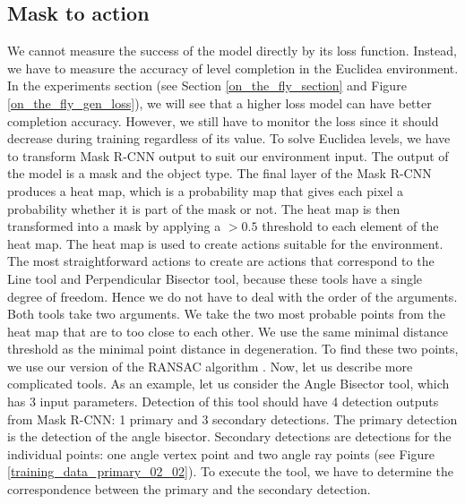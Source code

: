 \subsection{Mask to action}
We cannot measure the success of the model directly by its loss function. Instead, we have to measure the accuracy of level completion in the Euclidea environment. In the experiments section (see Section \ref{on_the_fly_section} and Figure \ref{on_the_fly_gen_loss}), we will see that a higher loss model can have better completion accuracy. However, we still have to monitor the loss since it should decrease during training regardless of its value.
\newline \newline
To solve Euclidea levels, we have to transform Mask {R-CNN} output to suit our environment input. The output of the model is a mask and the object type. The final layer of the Mask {R-CNN} produces a heat map, which is a probability map that gives each pixel a probability whether it is part of the mask or not. The heat map is then transformed into a mask by applying a $>0.5$ threshold to each element of the heat map. The heat map is used to create actions suitable for the environment.
\newline \newline The most straightforward actions to create are actions that correspond to the Line tool and Perpendicular Bisector tool, because these tools have a single degree of freedom. Hence we do not have to deal with  the order of the arguments. Both tools take two arguments. We take the two most probable points from the heat map that are to too close to each other. We use the same minimal distance threshold as the minimal point distance in degeneration. To find these two points, we use our version of the RANSAC algorithm \cite{Fischler81}.
\newline \newline
Now, let us describe more complicated tools. As an example, let us consider the Angle Bisector tool, which has 3 input parameters. Detection of this tool should have 4 detection outputs from Mask {R-CNN}: 1 primary and 3 secondary detections.
The primary detection is the detection of the angle bisector. Secondary detections are detections for the individual points: 
one angle vertex point and two angle ray points (see Figure \ref{training_data_primary_02_02}).
\newline \newline
To execute the tool, we have to determine the correspondence between the primary and the secondary detection.
